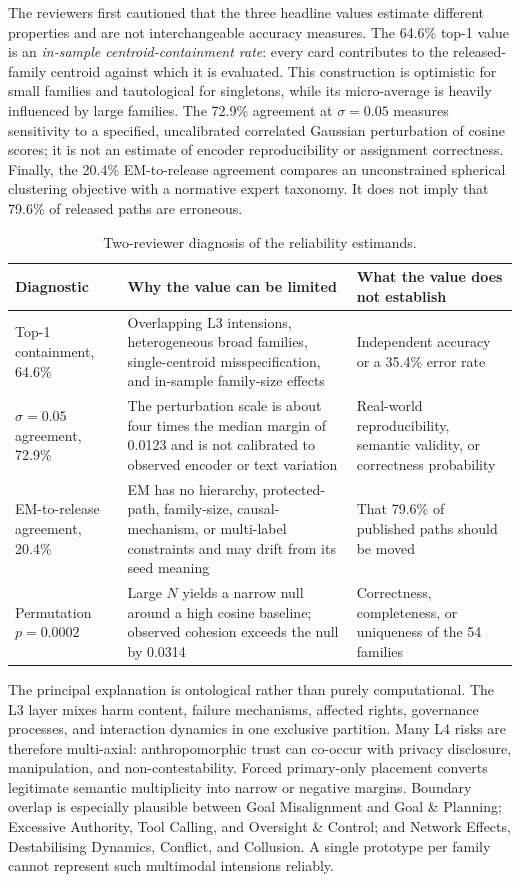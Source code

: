 \documentclass[11pt,a4paper]{article}
\begin{document}
The reviewers first cautioned that the three headline values estimate
different properties and are not interchangeable accuracy measures. The
64.6\% top-1 value is an \emph{in-sample centroid-containment rate}: every card
contributes to the released-family centroid against which it is evaluated.
This construction is optimistic for small families and tautological for
singletons, while its micro-average is heavily influenced by large families.
The 72.9\% agreement at $\sigma=0.05$ measures sensitivity to a specified,
uncalibrated correlated Gaussian perturbation of cosine scores; it is not an
estimate of encoder reproducibility or assignment correctness. Finally, the
20.4\% EM-to-release agreement compares an unconstrained spherical clustering
objective with a normative expert taxonomy. It does not imply that 79.6\% of
released paths are erroneous.

\begin{table}[H]
\centering
\caption{Two-reviewer diagnosis of the reliability estimands.}
\small
\begin{tabularx}{\textwidth}{p{2.5cm} X X}
\toprule
Diagnostic & Why the value can be limited & What the value does not establish \\
\midrule
Top-1 containment, 64.6\% & Overlapping L3 intensions, heterogeneous broad
families, single-centroid misspecification, and in-sample family-size effects
& Independent accuracy or a 35.4\% error rate \\
$\sigma=0.05$ agreement, 72.9\% & The perturbation scale is about four times
the median margin of 0.0123 and is not calibrated to observed encoder or text
variation & Real-world reproducibility, semantic validity, or correctness
probability \\
EM-to-release agreement, 20.4\% & EM has no hierarchy, protected-path,
family-size, causal-mechanism, or multi-label constraints and may drift from
its seed meaning & That 79.6\% of published paths should be moved \\
Permutation $p=0.0002$ & Large $N$ yields a narrow null around a high cosine
baseline; observed cohesion exceeds the null by 0.0314 & Correctness,
completeness, or uniqueness of the 54 families \\
\bottomrule
\end{tabularx}
\end{table}

The principal explanation is ontological rather than purely computational.
The L3 layer mixes harm content, failure mechanisms, affected rights,
governance processes, and interaction dynamics in one exclusive partition.
Many L4 risks are therefore multi-axial: anthropomorphic trust can co-occur
with privacy disclosure, manipulation, and non-contestability. Forced
primary-only placement converts legitimate semantic multiplicity into narrow
or negative margins. Boundary overlap is especially plausible between Goal
Misalignment and Goal \& Planning; Excessive Authority, Tool Calling, and
Oversight \& Control; and Network Effects, Destabilising Dynamics, Conflict,
and Collusion. A single prototype per family cannot represent such multimodal
intensions reliably.
\end{document}
